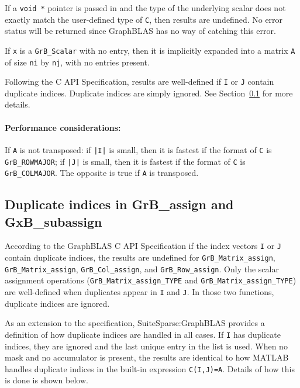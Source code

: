 \documentclass[12pt]{article}
\begin{document}
If a \verb'void *' pointer is passed in and the type of the underlying scalar
does not exactly match the user-defined type of \verb'C', then results are
undefined.  No error status will be returned since GraphBLAS has no way of
catching this error.

If \verb'x' is a \verb'GrB_Scalar' with no entry, then it is implicitly
expanded into a matrix \verb'A' of size \verb'ni' by \verb'nj', with no entries
present.

Following the C API Specification, results are well-defined if \verb'I' or
\verb'J' contain duplicate indices.  Duplicate indices are simply ignored.  See
Section~\ref{duplicates} for more details.

\paragraph{\bf Performance considerations:} %
If \verb'A' is not transposed: if \verb'|I|' is small, then it is fastest if
the format of \verb'C' is \verb'GrB_ROWMAJOR'; if \verb'|J|' is small, then it is
fastest if the format of \verb'C' is \verb'GrB_COLMAJOR'.  The opposite is true
if \verb'A' is transposed.

\newpage
\subsection{Duplicate indices in {\sf GrB\_assign} and {\sf GxB\_subassign}}
\label{duplicates}

According to the GraphBLAS C API Specification if the index vectors \verb'I' or
\verb'J' contain duplicate indices, the results are undefined for
\verb'GrB_Matrix_assign', \verb'GrB_Matrix_assign', \verb'GrB_Col_assign', and
\verb'GrB_Row_assign'.  Only the scalar assignment operations
(\verb'GrB_Matrix_assign_TYPE' and \verb'GrB_Matrix_assign_TYPE') are
well-defined when duplicates appear in \verb'I' and \verb'J'.  In those two
functions, duplicate indices are ignored.

As an extension to the specification, SuiteSparse:GraphBLAS provides a
definition of how duplicate indices are handled in all cases.  If \verb'I' has
duplicate indices, they are ignored and the last unique entry in the list is
used.  When no mask and no accumulator is present, the results are identical to
how MATLAB handles duplicate indices in the built-in expression
\verb'C(I,J)=A'.  Details of how this is done is shown below.
\end{document}
